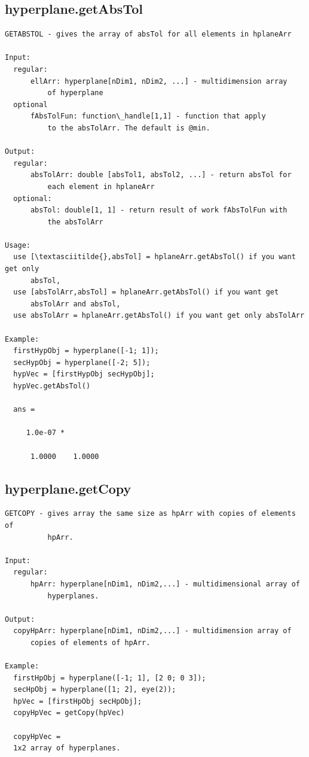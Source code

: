\documentclass[letterpaper,10pt,english]{sphinxmanual}
\begin{document}
\subsection{hyperplane.getAbsTol}
\label{chap_functions:hyperplane-getabstol}
\begin{Verbatim}[commandchars=\\\{\}]
GETABSTOL - gives the array of absTol for all elements in hplaneArr

Input:
  regular:
      ellArr: hyperplane[nDim1, nDim2, ...] - multidimension array
          of hyperplane
  optional
      fAbsTolFun: function\_handle[1,1] - function that apply
          to the absTolArr. The default is @min.

Output:
  regular:
      absTolArr: double [absTol1, absTol2, ...] - return absTol for
          each element in hplaneArr
  optional:
      absTol: double[1, 1] - return result of work fAbsTolFun with
          the absTolArr

Usage:
  use [\textasciitilde{},absTol] = hplaneArr.getAbsTol() if you want get only
      absTol,
  use [absTolArr,absTol] = hplaneArr.getAbsTol() if you want get
      absTolArr and absTol,
  use absTolArr = hplaneArr.getAbsTol() if you want get only absTolArr

Example:
  firstHypObj = hyperplane([-1; 1]);
  secHypObj = hyperplane([-2; 5]);
  hypVec = [firstHypObj secHypObj];
  hypVec.getAbsTol()

  ans =

     1.0e-07 *

      1.0000    1.0000
\end{Verbatim}


\subsection{hyperplane.getCopy}
\label{chap_functions:hyperplane-getcopy}
\begin{Verbatim}[commandchars=\\\{\}]
GETCOPY - gives array the same size as hpArr with copies of elements of
          hpArr.

Input:
  regular:
      hpArr: hyperplane[nDim1, nDim2,...] - multidimensional array of
          hyperplanes.

Output:
  copyHpArr: hyperplane[nDim1, nDim2,...] - multidimension array of
      copies of elements of hpArr.

Example:
  firstHpObj = hyperplane([-1; 1], [2 0; 0 3]);
  secHpObj = hyperplane([1; 2], eye(2));
  hpVec = [firstHpObj secHpObj];
  copyHpVec = getCopy(hpVec)

  copyHpVec =
  1x2 array of hyperplanes.
\end{Verbatim}
\end{document}
